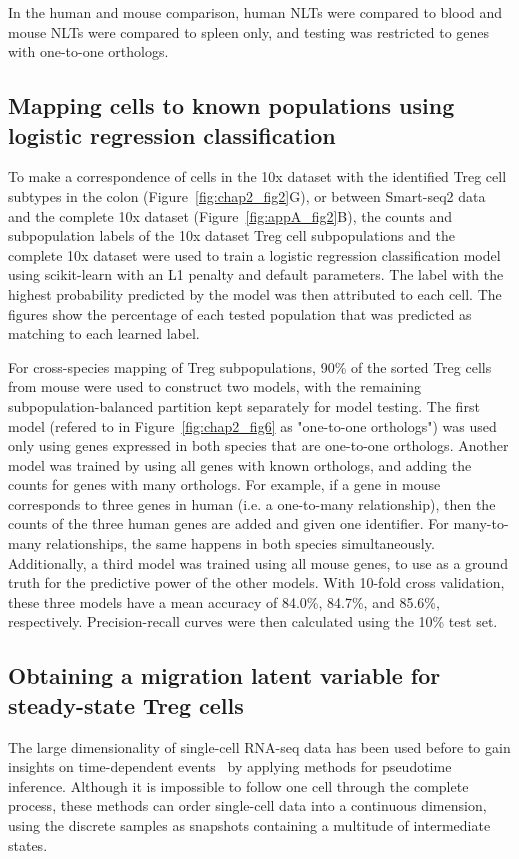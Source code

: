 In the human and mouse comparison, human NLTs were compared to blood and mouse NLTs were compared to spleen only, and testing was restricted to genes with one-to-one orthologs.

\subsection{Mapping cells to known populations using logistic regression classification}
To make a correspondence of cells in the 10x dataset with the identified Treg cell subtypes in the colon (Figure~\ref{fig:chap2_fig2}G), or between Smart-seq2 data and the complete 10x dataset (Figure~\ref{fig:appA_fig2}B), the counts and subpopulation labels of the 10x dataset Treg cell subpopulations and the complete 10x dataset were used to train a logistic regression classification model using scikit-learn with an L1 penalty and default parameters. The label with the highest probability predicted by the model was then attributed to each cell. The figures show the percentage of each tested population that was predicted as matching to each learned label.

For cross-species mapping of Treg subpopulations, 90\% of the sorted Treg cells from mouse were used to construct two models, with the remaining subpopulation-balanced partition kept separately for model testing. The first model (refered to in Figure~\ref{fig:chap2_fig6} as "one-to-one orthologs") was used only using genes expressed in both species that are one-to-one orthologs. Another model was trained by using all genes with known orthologs, and adding the counts for genes with many orthologs. For example, if a gene in mouse corresponds to three genes in human (i.e. a one-to-many relationship), then the counts of the three human genes are added and given one identifier. For many-to-many relationships, the same happens in both species simultaneously. Additionally, a third model was trained using all mouse genes, to use as a ground truth for the predictive power of the other models. With 10-fold cross validation, these three models have a mean accuracy of 84.0\%, 84.7\%, and 85.6\%, respectively. Precision-recall curves were then calculated using the 10\% test set.

\subsection{Obtaining a migration latent variable for steady-state Treg cells}
The large dimensionality of single-cell RNA-seq data has been used before to gain insights on time-dependent events~\citep{trapnell_dynamics_2014,lonnberg_single-cell_2017} by applying methods for pseudotime inference. Although it is impossible to follow one cell through the complete process, these methods can order single-cell data into a continuous dimension, using the discrete samples as snapshots containing a multitude of intermediate states.

